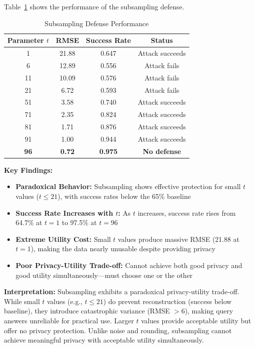 \documentclass[11pt,letterpaper]{article}
\begin{document}
Table~\ref{tab:subsampling} shows the performance of the subsampling defense.

\begin{table}[H]
\centering
\caption{Subsampling Defense Performance}
\label{tab:subsampling}
\begin{tabular}{@{}cccc@{}}
\toprule
\textbf{Parameter $t$} & \textbf{RMSE} & \textbf{Success Rate} & \textbf{Status} \\ \midrule
1 & 21.88 & 0.647 & Attack succeeds \\
6 & 12.89 & 0.556 & Attack fails \\
11 & 10.09 & 0.576 & Attack fails \\
21 & 6.72 & 0.593 & Attack fails \\
51 & 3.58 & 0.740 & Attack succeeds \\
71 & 2.35 & 0.824 & Attack succeeds \\
81 & 1.71 & 0.876 & Attack succeeds \\
91 & 1.00 & 0.944 & Attack succeeds \\
\textbf{96} & \textbf{0.72} & \textbf{0.975} & \textbf{No defense} \\ \bottomrule
\end{tabular}
\end{table}

\textbf{Key Findings:}

\begin{itemize}[leftmargin=*]
    \item \textbf{Paradoxical Behavior:} Subsampling shows effective protection for small $t$ values ($t \leq 21$), with success rates below the 65\% baseline
    \item \textbf{Success Rate Increases with $t$:} As $t$ increases, success rate rises from 64.7\% at $t=1$ to 97.5\% at $t=96$
    \item \textbf{Extreme Utility Cost:} Small $t$ values produce massive RMSE (21.88 at $t=1$), making the data nearly unusable despite providing privacy
    \item \textbf{Poor Privacy-Utility Trade-off:} Cannot achieve both good privacy and good utility simultaneously---must choose one or the other
\end{itemize}

\textbf{Interpretation:} Subsampling exhibits a paradoxical privacy-utility trade-off. While small $t$ values (e.g., $t \leq 21$) do prevent reconstruction (success below baseline), they introduce catastrophic variance (RMSE $> 6$), making query answers unreliable for practical use. Larger $t$ values provide acceptable utility but offer no privacy protection. Unlike noise and rounding, subsampling cannot achieve meaningful privacy with acceptable utility simultaneously.
\end{document}
